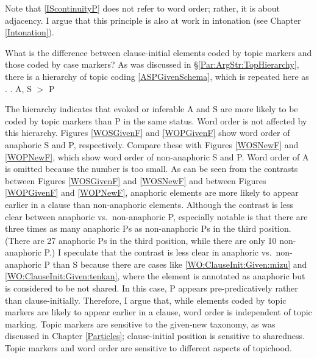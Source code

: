 Note that \ref{IScontinuityP} does not refer to word order;
rather, it is about adjacency.
I argue that this principle is also at work in intonation (see Chapter \ref{Intonation}).

What is the difference between clause-initial elements coded by topic markers and those coded by case markers?
As was discussed in \S \ref{Par:ArgStr:TopHierarchy},
there is a hierarchy of topic coding \ref{ASPGivenSchema},
which is repeated here as \Next.
%
\ex.
 A, S $>$ P

The hierarchy indicates that
evoked or inferable A and S are more likely to be coded by topic markers than P in the same status.
Word order is not affected by this hierarchy.
Figures \ref{WOSGivenF} and \ref{WOPGivenF} show word order of
anaphoric S and P, respectively.
Compare these with Figures \ref{WOSNewF} and \ref{WOPNewF},
which show word order of non-anaphoric S and P.
Word order of A is omitted because the number is too small.
As can be seen from the contrasts between Figures \ref{WOSGivenF} and \ref{WOSNewF} and between Figures \ref{WOPGivenF} and \ref{WOPNewF},
anaphoric elements are more likely to appear earlier in a clause than non-anaphoric elements.
Although the contrast is less clear between anaphoric vs.~non-anaphoric P,
especially notable is that there are three times as many anaphoric Ps as non-anaphoric Ps in the third position.
(There are 27 anaphoric Ps in the third position,
while there are only 10 non-anaphoric P.)
I speculate that the contrast is less clear in anaphoric vs.~non-anaphoric P than S because there are cases like \ref{WO:ClauseInit:Given:mizu} and \ref{WO:ClauseInit:Given:tenkan},
where the element is annotated as anaphoric but is considered to be not shared.
In this case, P appears pre-predicatively rather than clause-initially.
Therefore, I argue that,
while elements coded by topic markers are likely to appear earlier in a clause,
word order is independent of topic marking.
Topic markers are sensitive to the given-new taxonomy, as was discussed in Chapter \ref{Particles};
clause-initial position is sensitive to sharedness.
Topic markers and word order are sensitive to different aspects of topichood.

